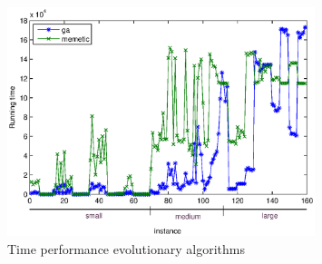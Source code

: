 
\begin{figure}[!htbp]
  \begin{center}
   \includegraphics[width=0.8\textwidth]{Images/Chapter5/compare_times_evol.eps}
  \end{center}
    \caption{Time performance evolutionary algorithms}\label{fig:compare_times_evol}
\end{figure}

